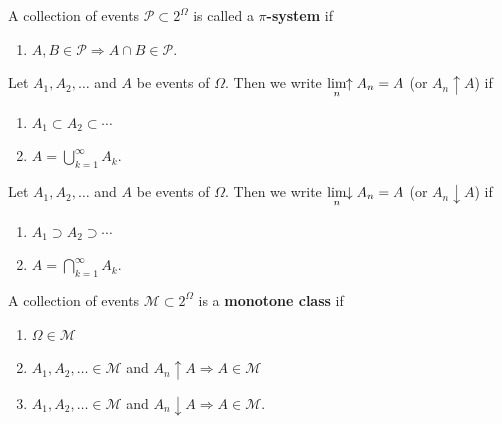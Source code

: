 \begin{definition}[{\bf $\pi$-system}]
A  collection of events $\mathcal P\subset 2^\Omega$ is called a {\bf $\pi$-system} if
\begin{enumerate}
\item $A, B\in\mathcal P \Longrightarrow A\cap B\in\mathcal P$.
\end{enumerate}
\end{definition}




\begin{definition}[{\bf $A_n\uparrow A$}]
Let $A_1, A_2, \ldots$  and $A$ be events of $\Omega$. Then we write $\displaystyle\lim_{n}\!\!\uparrow A_n = A$ (or $A_n\uparrow A$) if
\begin{enumerate}
\item $A_1\subset A_2 \subset \cdots$
\item $A=\bigcup_{k=1}^\infty A_k$.
\end{enumerate}
\end{definition}

\begin{definition}[{\bf $A_n\downarrow A$}]
Let $A_1, A_2, \ldots$  and $A$ be events of $\Omega$. Then we write $\displaystyle\lim_{n}\!\!\downarrow A_n = A$ (or $A_n\downarrow A$) if
\begin{enumerate}
\item $A_1\supset A_2 \supset \cdots$
\item $A=\bigcap_{k=1}^\infty A_k$.
\end{enumerate}
\end{definition}



\begin{definition}
A collection of events $\mathcal M\subset 2^\Omega$  is a {\bf monotone class} if
\begin{enumerate}
\item $\Omega \in \mathcal M$
\item $A_1, A_2,\ldots\in\mathcal M$ and $A_n\uparrow A \Longrightarrow A\in\mathcal M$
\item $A_1, A_2,\ldots\in\mathcal M$ and $A_n\downarrow A \Longrightarrow A\in\mathcal M$.
\end{enumerate}
\end{definition}




